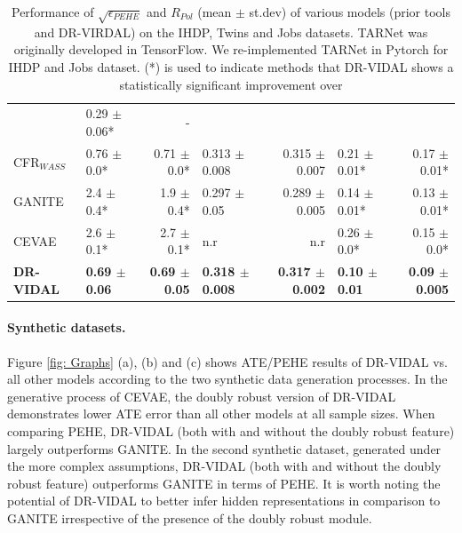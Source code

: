 \documentclass{amia}
\begin{document}
\begin{table}[h]
\begin{tabular}{p{1.5cm}|l r|l r|l r}
      & 0.29 $\pm$ 0.06* & -\\
      CFR$_{WASS}$ & 0.76 $\pm$ 0.0* & 0.71 $\pm$ 0.0* & 0.313 $\pm$ 0.008 & 0.315 $\pm$ 0.007
      & 0.21 $\pm$ 0.01* & 0.17 $\pm$ 0.01*\\
\midrule 
      GANITE   & 2.4 $\pm$ 0.4* & 1.9 $\pm$ 0.4* & 0.297 $\pm$ 0.05 & 0.289 $\pm$ 0.005
      & 0.14 $\pm$ 0.01* & 0.13 $\pm$ 0.01*\\
      CEVAE    & 2.6 $\pm$ 0.1* & 2.7 $\pm$ 0.1* & n.r & n.r
      & 0.26 $\pm$ 0.0* & 0.15 $\pm$ 0.0*\\
\midrule
      \textbf{DR-VIDAL}  & \textbf{0.69 $\pm$ 0.06} & \textbf{0.69 $\pm$ 0.05} 
      & \textbf{0.318 $\pm$ 0.008} & \textbf{0.317 $\pm$ 0.002} & \textbf{0.10 $\pm$ 0.01}
      & \textbf{0.09 $\pm$ 0.005} \\
\bottomrule
\end{tabular}
\caption{Performance of $\sqrt{\epsilon_{PEHE}}$ and $R_{Pol}$ (mean $\pm$ st.dev) of
various models (prior tools and DR-VIRDAL) on the IHDP, Twins and Jobs datasets. TARNet was originally developed in TensorFlow. We re-implemented TARNet in Pytorch for IHDP and Jobs dataset. (*) is used to indicate methods that DR-VIDAL shows a statistically significant improvement over}\smallskip
\label{tab: IHDP_Jobs_Twins}
\end{table}

\paragraph{Synthetic datasets.}
Figure \ref{fig: Graphs} (a), (b) and (c) shows ATE/PEHE results of DR-VIDAL vs. all other models according to the two synthetic data generation processes. In the generative process of CEVAE, the doubly robust version of DR-VIDAL demonstrates lower ATE error than all other models at all sample sizes. When comparing PEHE, DR-VIDAL (both with and without the doubly robust feature) largely outperforms GANITE. In the second synthetic dataset, generated under the more complex assumptions, DR-VIDAL (both with and without the doubly robust feature) outperforms GANITE in terms of PEHE. It is worth noting the potential of DR-VIDAL to better infer hidden representations in comparison to GANITE irrespective of the presence of the doubly robust module.
\end{document}
